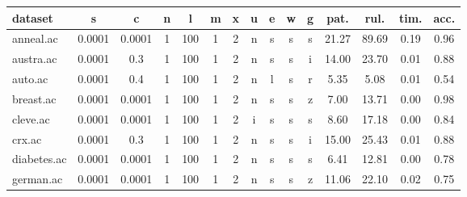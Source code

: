 \begin{table}[htbp]
	\centering
		\begin{tabular}{|l|c|c|c|c|c|c|c|c|c|c||c|c|c|c|}
		\hline
		\textbf{dataset}	& \textbf{s}	& \textbf{c}	& \textbf{n}	& \textbf{l}	& \textbf{m}	& \textbf{x}	& \textbf{u}	& \textbf{e} & \textbf{w} & \textbf{g} & \textbf{pat.}	& \textbf{rul.}	& \textbf{tim.}	& \textbf{acc.}	\\
		\hline
		anneal.ac      & 0.0001   & 0.0001      & 1              & 100                 & 1             & 2        & n             & s      & s        & s        & 21.27          & 89.69          & 0.19           & 0.96           \\
		\hline
		austra.ac      & 0.0001   & 0.3         & 1              & 100                 & 1             & 2        & n             & s      & s        & i        & 14.00          & 23.70          & 0.01           & 0.88           \\
		\hline
		auto.ac        & 0.0001   & 0.4         & 1              & 100                 & 1             & 2        & n             & l      & s        & r        & 5.35           & 5.08           & 0.01           & 0.54           \\
		\hline
		breast.ac      & 0.0001   & 0.0001      & 1              & 100                 & 1             & 2        & n             & s      & s        & z        & 7.00           & 13.71          & 0.00           & 0.98           \\
		\hline
		cleve.ac       & 0.0001   & 0.0001      & 1              & 100                 & 1             & 2        & i             & s      & s        & s        & 8.60           & 17.18          & 0.00           & 0.84           \\
		\hline
		crx.ac         & 0.0001   & 0.3         & 1              & 100                 & 1             & 2        & n             & s      & s        & i        & 15.00          & 25.43          & 0.01           & 0.88           \\
		\hline
		diabetes.ac    & 0.0001   & 0.0001      & 1              & 100                 & 1             & 2        & n             & s      & s        & s        & 6.41           & 12.81          & 0.00           & 0.78           \\
		\hline
		german.ac      & 0.0001   & 0.0001      & 1              & 100                 & 1             & 2        & n             & s      & s        & z        & 11.06          & 22.10          & 0.02           & 0.75           \\

\end{tabular}
\end{table}
